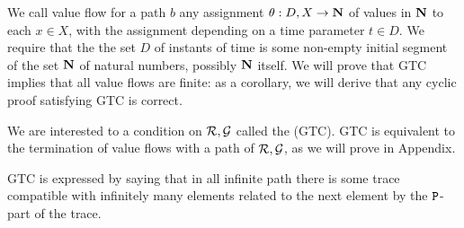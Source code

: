 \documentclass{lmcs}
\newtheorem{definition}[theorem]{Definition}
\begin{document}

We call value flow for a path $b$ any assignment $\theta:D,X\rightarrow {\bf N}$
of values in ${\bf N}$ to each $x \in X$, with the assignment 
depending on a time parameter $t \in D$. We require that the the set $D$ of instants
of time is some non-empty initial segment of the set ${\bf N}$ of natural numbers,
possibly ${\bf N}$ itself. We will prove that GTC implies that all value flows are finite:
as a corollary, we will derive that any cyclic proof satisfying GTC is correct.
%
%



We are interested to a condition on ${\mathcal R}, {\mathcal G}$
called the  (GTC).
GTC is equivalent to the 
termination of value flows 
with a path of ${\mathcal R}, {\mathcal G}$, as we will prove in Appendix.

GTC is expressed by saying that in all infinite path there is some trace compatible
with infinitely many elements related to the next element by the ${\tt P}$-part of
the trace.
\end{document}
